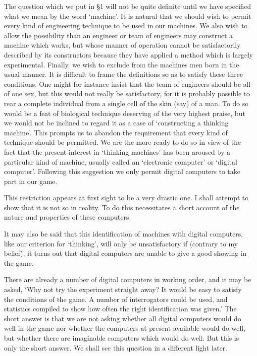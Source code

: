 \documentclass[10pt]{article} %
\begin{document}
The question which we put in \S 1 will not be quite definite until we have specified what we mean by the word `machine'. It is natural that we should wish to permit every kind of engineering technique to be used in our machines. We also wish to allow the possibility than an engineer or team of engineers may construct a machine which works, but whose manner of operation cannot be satisfactorily described by its constructors because they have applied a method which is largely experimental. Finally, we wish to exclude from the machines men born in the usual manner. It is difficult to frame the definitions so as to satisfy these three conditions. One might for instance insist that the team of engineers should be all of one sex, but this would not really be satisfactory, for it is probably possible to rear a complete individual from a single cell of the skin (say) of a man. To do so would be a feat of biological technique deserving of the very highest praise, but we would not be inclined to regard it as a case of `constructing a thinking machine'. This prompts us to abandon the requirement that every kind of technique should be permitted. We are the more ready to do so in view of the fact that the present interest in `thinking machines' has been aroused by a particular kind of machine, usually called an `electronic computer' or `digital computer'. Following this suggestion we only permit digital computers to take part in our game.

This restriction appears at first sight to be a very drastic one. I shall attempt to show that it is not so in reality. To do this necessitates a short account of the nature and properties of these computers.

It may also be said that this identification of machines with digital computers, like our criterion for `thinking', will only be unsatisfactory if (contrary to my belief), it turns out that digital computers are unable to give a good showing in the game.

There are already a number of digital computers in working order, and it may be asked, `Why not try the experiment straight away? It would be easy to satisfy the conditions of the game. A number of interrogators could be used, and statistics compiled to show how often the right identification was given.' The short answer is that we are not asking whether all digital computers would do well in the game nor whether the computers at present available would do well, but whether there are imaginable computers which would do well. But this is only the short answer. We shall see this question in a different light later.
\end{document}
